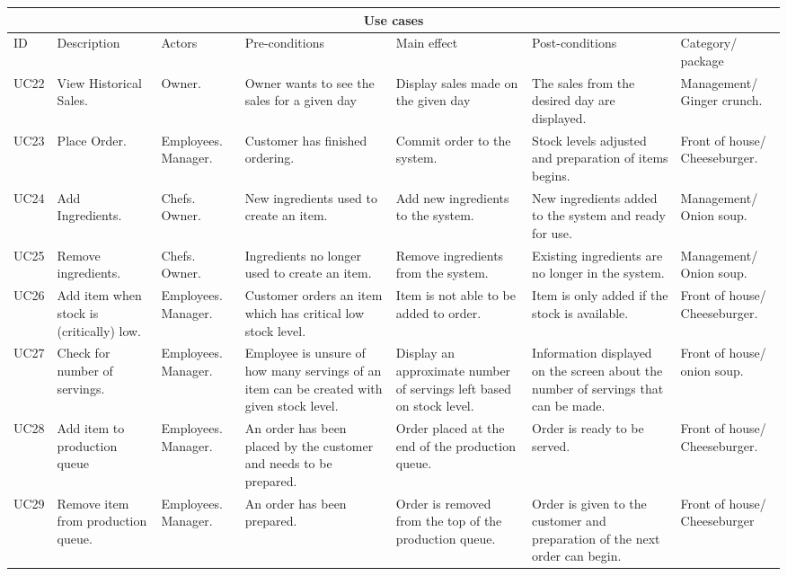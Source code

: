 \begin{table}[H]
\begin{tabularx}{\linewidth}{|X|X|X|X|X|X|X|}
\hline
\multicolumn{7}{c}{ Use cases } \\
\hline
ID & Description & Actors & Pre-conditions & Main effect & Post-conditions & Category/ package \\
\hline
UC22 & View Historical Sales. & Owner. & Owner wants to see the sales for a given day& Display sales made on the given day& The sales from the desired day are displayed. & Management/ Ginger crunch. \\
\hline
UC23 & Place Order. & Employees. Manager. & Customer has finished ordering. & Commit order to the system. & Stock levels adjusted and preparation of items begins. & Front of house/ Cheeseburger. \\
\hline
UC24 & Add Ingredients. & Chefs. Owner. & New ingredients used to create an item. & Add new ingredients to the system. & New ingredients added to the system and ready for use. & Management/ Onion soup. \\
\hline 
UC25 & Remove ingredients. & Chefs. Owner. & Ingredients no longer used to create an item. & Remove ingredients from the system. & Existing ingredients are no longer in the system. & Management/ Onion soup. \\
\hline
UC26 & Add item when stock is (critically) low. & Employees. Manager. & Customer orders an item which has critical low stock level. & Item is not able to be added to order. & Item is only added if the stock is available. & Front of house/ Cheeseburger. \\
\hline
UC27 & Check for number of servings. & Employees. Manager. & Employee is unsure of how many servings of an item can be created with given stock level. & Display an approximate number of servings left based on stock level. & Information displayed on the screen about the number of servings that can be made. & Front of house/ onion soup. \\
\hline
UC28 & Add item to production queue & Employees. Manager. & An order has been placed by the customer and needs to be prepared. & Order placed at the end of the production queue. & Order is ready to be served. & Front of house/ Cheeseburger. \\
\hline
UC29 & Remove item from production queue. & Employees. Manager. & An order has been prepared. & Order is removed from the top of the production queue. & Order is given to the customer and preparation of the next order can begin. & Front of house/ Cheeseburger \\

\end{tabularx}
\end{table}
